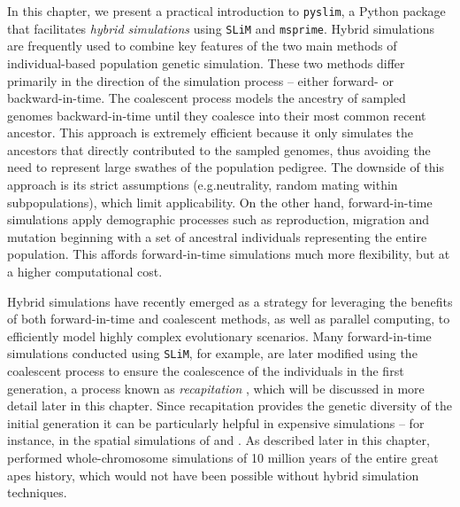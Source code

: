 \documentclass[12pt]{article}
\newcommand{\msprime}[0]{\texttt{msprime}\xspace}
\newcommand{\slim}[0]{\texttt{SLiM}\xspace}
\newcommand{\pyslim}[0]{\texttt{pyslim}\xspace}
\newcommand{\stdpopsim}[0]{\texttt{stdpopsim}\xspace}
\newcommand*{\eg}{e.g.\xcomma}
\begin{document}
In this chapter, we present a practical introduction to \pyslim, a Python package that facilitates \emph{hybrid simulations}
using \slim and \msprime.
Hybrid simulations are frequently used to combine key features of the two main methods of individual-based population genetic simulation.
These two methods differ primarily in the direction of the simulation
process -- either forward- or backward-in-time. 
The coalescent process models the ancestry of sampled genomes
backward-in-time until they coalesce into their most common recent ancestor. %
This approach is extremely efficient because it only simulates the ancestors that directly contributed to the sampled genomes,
thus avoiding the need to represent large swathes of the population pedigree. 
The downside of this approach is its strict assumptions (\eg neutrality, random mating within subpopulations), 
which limit applicability.
On the other hand, forward-in-time simulations apply demographic processes
such as reproduction, migration and mutation
beginning with a set of ancestral individuals representing the entire population.
This affords forward-in-time simulations much more flexibility,
but at a higher computational cost.

Hybrid simulations have recently emerged as a strategy for leveraging the benefits of both forward-in-time and coalescent methods, as well as parallel computing,
to efficiently model highly complex evolutionary scenarios.
Many forward-in-time simulations conducted using \slim, for example, are later modified using the coalescent process to ensure the coalescence of the individuals in the first generation, a process known as \emph{recapitation} \citep{kelleher_efficient_2018}, which will be discussed in more detail later in this chapter.
Since recapitation provides the genetic diversity of the initial generation
it can be particularly helpful in expensive simulations --
for instance,
in the spatial simulations of \citet{battey_space_2020} and \citet{petr_slendr_2023}.
As described later in this chapter,
\citet{rodrigues_shared_2024} performed whole-chromosome simulations of 10 million years of the entire great apes history,
which would not have been possible without hybrid simulation techniques.
\end{document}
